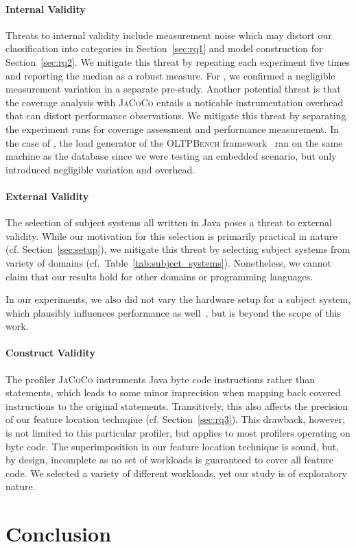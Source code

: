 \paragraph*{Internal Validity}\label{sec:internal_validity}
Threats to internal validity include measurement noise which may distort our classification into categories in Section~\ref{sec:rq1} and model construction for Section~\ref{sec:rq2}. We mitigate this threat by repeating each experiment five times and reporting the median as a robust measure. For \htwo, we confirmed a negligible measurement variation in a separate pre-study.
Another potential threat is that the coverage analysis with \mbox{\textsc{JaCoCo}} entails a noticable instrumentation overhead that can distort performance observations. We mitigate this threat by separating the experiment runs for coverage assessment and performance measurement. In the case of \htwo, the load generator of the \textsc{OLTPBench} framework~\cite{difallah_oltp_2013} ran on the same machine as the database since we were testing an embedded scenario, but only introduced negligible variation and overhead.

\paragraph*{External Validity}\label{sec:external_validity}
The selection of subject systems all written in Java poses a threat to external validity. While our motivation for this selection is primarily practical in nature (cf. Section~\ref{sec:setup}), we mitigate this threat by selecting subject systems from variety of domains (cf.~Table~\ref{tab:subject_systems}). Nonetheless, we cannot claim that our results hold for other domains or programming languages. 

In our experiments, we also did not vary the hardware setup for a subject system, which plausibly influences performance as well~\cite{ding_bayesian_2020}, but is beyond the scope of this work. 

\paragraph{Construct Validity}\label{sec:construct_validity}
The profiler \textsc{JaCoCo} instruments Java byte code instructions rather than statements, which leads to some minor imprecision when mapping back covered instructions to the original statements. Transitively, this also affects the precision of our feature location technqiue (cf. Section~\ref{sec:rq3}). This drawback, however, is not limited to this particular profiler, but applies to most profilers operating on byte code. 
The superimposition in our feature location technique is sound, but, by design, incomplete as no set of workloads is guaranteed to cover all feature code. We selected a variety of different workloads, yet our study is of exploratory nature.


\section{Conclusion}
